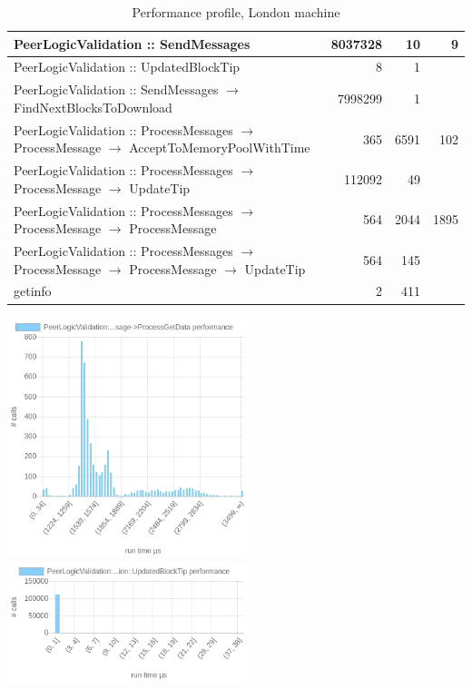 \documentclass{article}
\begin{document}
\begin{table}
\begin{longtable}{P{8cm}|r|r|r}
	PeerLogicValidation :: SendMessages& 8037328& 10&9\\\hline
	PeerLogicValidation :: UpdatedBlockTip& 8& 1&\\\hline
	PeerLogicValidation :: SendMessages $\to$ FindNextBlocksToDownload& 7998299& 1&\\\hline
	PeerLogicValidation :: ProcessMessages $\to$ ProcessMessage $\to$ AcceptToMemoryPoolWithTime& 365& 6591&102\\\hline
	PeerLogicValidation :: ProcessMessages $\to$ ProcessMessage $\to$ UpdateTip& 112092& 49&\\\hline
	PeerLogicValidation :: ProcessMessages $\to$ ProcessMessage $\to$ ProcessMessage& 564& 2044&1895\\\hline
	PeerLogicValidation :: ProcessMessages $\to$ ProcessMessage $\to$ ProcessMessage $\to$ UpdateTip& 564& 145&\\\hline
	getinfo& 2& 411&\\\hline
\end{longtable}

\caption{\label{tableProfilingLondon} Performance profile, London machine}
\end{table}

\includegraphics[width=7cm]{images/london/chartPeerLogicValidation_3A_3AProcessMessages-_3EProcessMessage-_3EProcessGetData.png}
\includegraphics[width=7cm]{images/london/chartPeerLogicValidation_3A_3AProcessMessages-_3EProcessMessage-_3EPeerLogicValidation_3A_3AUpdatedBlockTip.png}
\end{document}
